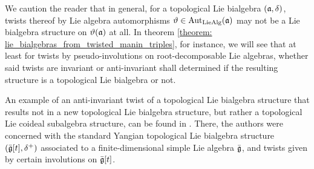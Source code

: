         \begin{remark}
            We caution the reader that in general, for a topological Lie bialgebra $(\mathfrak{a}, \delta)$, twists thereof by Lie algebra automorphisms $\vartheta \in \operatorname{Aut}_{\mathrm{Lie}\mathrm{Alg}}(\mathfrak{a})$ may not be a Lie bialgebra structure on $\vartheta(\mathfrak{a})$ at all. In theorem \ref{theorem: lie_bialgebras_from_twisted_manin_triples}, for instance, we will see that at least for twists by pseudo-involutions on root-decomposable Lie algebras, whether said twists are invariant or anti-invariant shall determined if the resulting structure is a topological Lie bialgebra or not.
        \end{remark}
        \begin{example} \label{example: yangian_twisted_current_algebras}
            An example of an anti-invariant twist of a topological Lie bialgebra structure that results not in a new topological Lie bialgebra structure, but rather a topological Lie coideal subalgebra structure, can be found in \cite[Subsection 3.5]{guay_regelskis_twisted_yangians_for_symmetric_pairs_of_types_BCD}. There, the authors were concerned with the standard Yangian topological Lie bialgebra structure $(\bar{\mathfrak{g}}[t], \delta^+)$ associated to a finite-dimensional simple Lie algebra $\bar{\mathfrak{g}}$, and twists given by certain involutions on $\bar{\mathfrak{g}}[t]$.
        \end{example}


